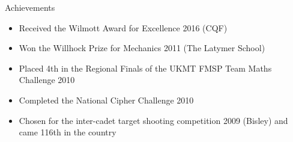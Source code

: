\documentclass{resume} %
\begin{document}



\begin{rSection}{Achievements}

\begin{itemize}
	\item Received the Wilmott Award for Excellence 2016 (CQF)
	\item Won the Willhock Prize for Mechanics 2011 (The Latymer School)
	\item Placed 4th in the Regional Finals of the UKMT FMSP Team Maths Challenge 2010
	\item Completed the National Cipher Challenge 2010
	\item Chosen for the inter-cadet target shooting competition 2009 (Bisley) and came 116th in the country
\end{itemize}

\end{rSection}

\iffalse
\begin{rSection}{Skills and Interests}
Computing: Matlab (Advanced), VBA (Advanced), Microsoft Excel (Advanced), LaTeX (Advanced),  C++ (Intermediate), Bloomberg Terminal (Intermediate), Java (Basic),  Python (Basic), R (Basic)
\item Interests: Poker, Basketball, Rock Climbing, Cycling, Target Shooting, Developing Android applications
\item Languages: English and Gujarati (Bilingual), German (Basic), Hindi (Basic)
\item {\bf For further details on my projects and experience, visit: \href{www.jtolia.com}{www.jtolia.com}}
\end{rSection}
\fi




\end{document}
